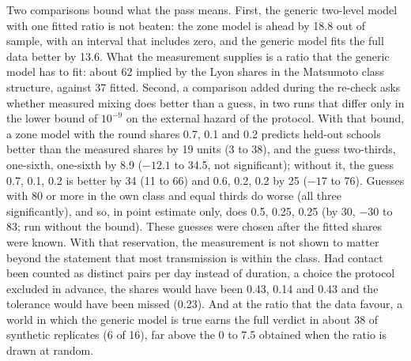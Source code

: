 Two comparisons bound what the pass means. First, the generic two-level model with one fitted ratio is not
beaten: the zone model is ahead by 18.8 out of sample, with an interval that includes zero, and the generic
model fits the full data better by 13.6. What the measurement supplies is a ratio that the generic model has to
fit: about 62 implied by the Lyon shares in the Matsumoto class structure, against 37 fitted. Second, a
comparison added during the re-check asks whether measured mixing does better than a guess, in two runs that differ only in the lower
bound of $10^{-9}$ on the external hazard of the protocol. With that bound, a zone model with the round shares
0.7, 0.1 and 0.2 predicts held-out schools better than the measured shares by 19 units (3 to 38), and the
guess two-thirds, one-sixth, one-sixth by 8.9 ($-12.1$ to 34.5, not significant); without it, the guess 0.7, 0.1, 0.2 is better by 34 (11 to 66)
and 0.6, 0.2, 0.2 by 25 ($-17$ to 76). Guesses with 80\pct{} or more in the own class and equal thirds do worse
(all three significantly), and so, in point estimate only, does 0.5, 0.25, 0.25 (by 30, $-30$ to 83;
run without the bound). These guesses were chosen after the fitted shares were known. With that reservation, the measurement is not shown to matter beyond the statement that most
transmission is within the class. Had contact been counted as distinct pairs per day instead of duration, a
choice the protocol excluded in advance, the shares would have been 0.43, 0.14 and 0.43 and the tolerance
would have been missed (0.23). And at the ratio that the data favour, a world in which the generic model is
true earns the full verdict in about 38\pct{} of synthetic replicates (6 of 16), far above the 0 to 7.5\pct{}
obtained when the ratio is drawn at random.


